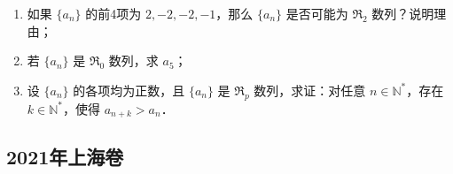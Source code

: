 \begin{description}
\begin{enumerate}[leftmargin=5pt]
        \begin{enumerate}[label=(\arabic*)]
            \item 如果 $\{a_n\}$ 的前4项为 $2,-2,-2,-1$，那么 $\{a_n\}$ 是否可能为 $\Re_2$ 数列？说明理由；
            \item 若 $\{a_n\}$ 是 $\Re_0$ 数列，求 $a_5$；
            \item 设 $\{a_n\}$ 的各项均为正数，且 $\{a_n\}$ 是 $\Re_p$ 数列，求证：对任意 $n\in\mathbb{N}^*$，存在 $k\in\mathbb{N}^*$，使得 $a_{n+k}>a_n$．
        \end{enumerate}
    \end{enumerate}
\end{description}
\clearpage









\subsection{2021年上海卷}\label{gk:2021年上海卷}

